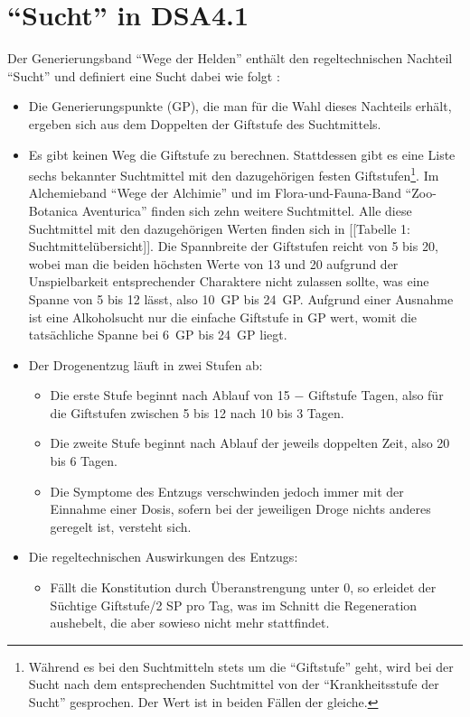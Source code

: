 \section{\enquote{Sucht} in DSA4.1}
Der Generierungsband \enquote{Wege der Helden} \cite{WdH} enthält den regeltechnischen Nachteil \enquote{Sucht} und definiert eine Sucht dabei wie folgt \cite[S.~271]{WdH}:

\begin{itemize}
	\item Die Generierungspunkte (GP), die man für die Wahl dieses Nachteils erhält, ergeben sich aus dem Doppelten der Giftstufe des Suchtmittels.
	\item Es gibt keinen Weg die Giftstufe zu berechnen. Stattdessen gibt es eine Liste sechs bekannter Suchtmittel mit den dazugehörigen festen Giftstufen\footnote{Während es bei den Suchtmitteln stets um die \enquote{Giftstufe} geht, wird bei der Sucht nach dem entsprechenden Suchtmittel von der \enquote{Krankheitsstufe der Sucht} gesprochen. Der Wert ist in beiden Fällen der gleiche.}. Im Alchemieband \enquote{Wege der Alchimie} \cite{WdA} und im Flora-und-Fauna-Band \enquote{Zoo-Botanica Aventurica} \cite{ZBA} finden sich zehn weitere Suchtmittel. Alle diese Suchtmittel mit den dazugehörigen Werten finden sich in [[Tabelle 1: Suchtmittelübersicht]]. Die Spannbreite der Giftstufen reicht von 5 bis 20, wobei man die beiden höchsten Werte von 13 und 20 aufgrund der Unspielbarkeit entsprechender Charaktere nicht zulassen sollte, was eine Spanne von 5 bis 12 lässt, also 10~GP bis 24~GP. Aufgrund einer Ausnahme ist eine Alkoholsucht nur die einfache Giftstufe in GP wert, womit die tatsächliche Spanne bei 6~GP bis 24~GP liegt.
	\item Der Drogenentzug läuft in zwei Stufen ab:
		\begin{itemize}
			\item Die erste Stufe beginnt nach Ablauf von 15 − Giftstufe Tagen, also für die Giftstufen zwischen 5 bis 12 nach 10 bis 3 Tagen.
			\item Die zweite Stufe beginnt nach Ablauf der jeweils doppelten Zeit, also 20 bis 6 Tagen.
			\item Die Symptome des Entzugs verschwinden jedoch immer mit der Einnahme einer Dosis, sofern bei der jeweiligen Droge nichts anderes geregelt ist, versteht sich.
		\end{itemize}
	\item Die regeltechnischen Auswirkungen des Entzugs:
		\begin{itemize}
			\item Fällt die Konstitution durch Überanstrengung unter 0, so erleidet der Süchtige Giftstufe/2 SP pro Tag, was im Schnitt die Regeneration aushebelt, die aber sowieso nicht mehr stattfindet.

\end{itemize}
\end{itemize}
